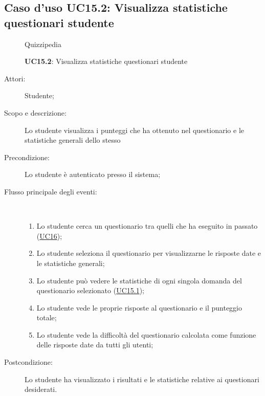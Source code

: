 \subsection{Caso d'uso UC15.2: Visualizza statistiche questionari studente}
	\begin{figure}[H]
		\centering
		\begin{resizedtikzpicture}{\textwidth}
		\begin{umlsystem}[x=0, fill=lightgray!20]{Quizzipedia}
		\end{umlsystem}
		\end{resizedtikzpicture}
		\caption{\textbf{UC15.2}: Visualizza statistiche questionari studente}
		\label{UC15.2}
	\end{figure}
\begin{description}
\item[Attori:] Studente;
\item[Scopo e descrizione:] Lo studente visualizza i punteggi che ha ottenuto nel questionario e le statistiche generali dello stesso
      \item[Precondizione:] Lo studente è autenticato presso il sistema;

        \item[Flusso principale degli eventi:] \ 
 \begin{enumerate}
          \item Lo studente cerca un questionario tra quelli che ha eseguito in passato (\hyperlink{UC16}{UC16});
          \item Lo studente seleziona il questionario per visualizzarne le risposte date e le statistiche generali;
          \item Lo studente può vedere le statistiche di ogni singola domanda del questionario selezionato (\hyperlink{UC15.1}{UC15.1});
          \item Lo studente vede le proprie risposte al questionario e il punteggio totale;
          \item Lo studente vede la difficoltà del questionario calcolata come funzione delle risposte date da tutti gli utenti;

      \end{enumerate}
    \item[Postcondizione:] Lo studente ha visualizzato i risultati e le statistiche relative ai questionari desiderati.
  \end{description}
\hypertarget{UC15.3}{}
